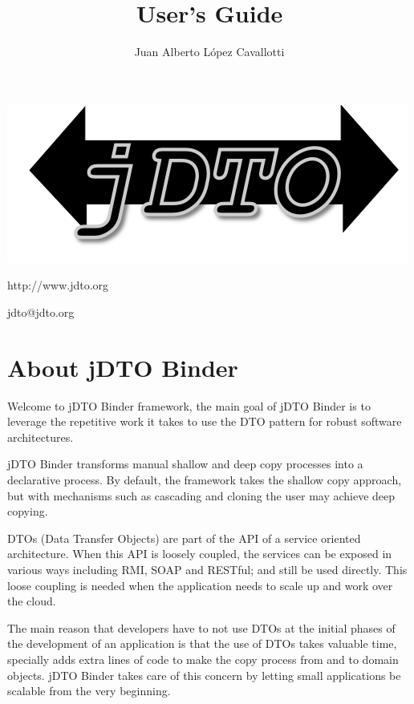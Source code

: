\documentclass[11pt]{article}
\title{\JDTO \JDV User's Guide}
\author{Juan Alberto López Cavallotti}
\newcommand{\JDTO}{jDTO Binder\xspace}
\begin{document}
\maketitle

\begin{center}

\includegraphics[scale=1]{logo.png}

\begin{huge}
 http://www.jdto.org
\end{huge}

\begin{LARGE}
 jdto@jdto.org
\end{LARGE}
\end{center}


\newpage
\tableofcontents

\newpage


\section{About \JDTO}


Welcome to \JDTO framework, the main goal of \JDTO is to leverage the repetitive work it takes to use
the DTO pattern for robust software architectures. 

\JDTO transforms manual shallow and deep copy processes into a declarative process. By default, the framework
takes the shallow copy approach, but with mechanisms such as cascading and cloning the user may achieve deep
copying.

DTOs (Data Transfer Objects) are part of the API of a service oriented architecture. When this API is loosely coupled, the services can be exposed in various ways including RMI, SOAP and RESTful; and still be used directly. This loose coupling is needed when the application needs to scale up and work over the cloud.

The main reason that developers have to not use DTOs at the initial phases of the development of an application is that the use of DTOs takes valuable time, specially adds extra lines of code to make the copy process from and to domain objects. \JDTO takes care of this concern by letting small applications be scalable from the very beginning.
\end{document}
